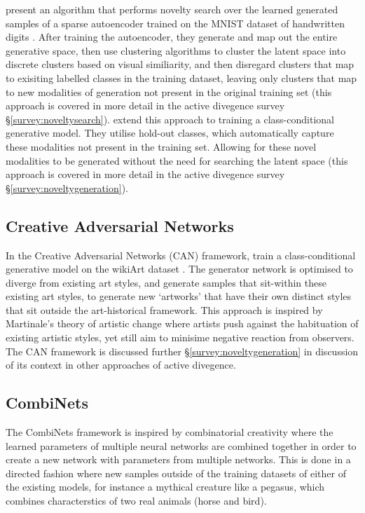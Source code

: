 \citet{kazakcci2016digits} present an algorithm that performs novelty search over the learned generated samples of a sparse autoencoder trained on the MNIST dataset of handwritten digits \citep{lecun1998gradient}.
After training the autoencoder, they generate and map out the entire generative space, then use clustering algorithms to cluster the latent space into discrete clusters based on visual similiarity, and then disregard clusters that map to exisiting labelled classes in the training dataset, leaving only clusters that map to new modalities of generation not present in the original training set (this approach is covered in more detail in the active divegence survey \S \ref{survey:noveltysearch}). 
\citep{cherti2017out} extend this approach to training a class-conditional generative model. 
They utilise hold-out classes, which automatically capture these modalities not present in the training set. 
Allowing for these novel modalities to be generated without the need for searching the latent space (this approach is covered in more detail in the active divegence survey \S \ref{survey:noveltygeneration}).   

\subsection{Creative Adversarial Networks}

In the Creative Adversarial Networks (CAN) framework, \cite{elgammal2017can} train a class-conditional generative model on the wikiArt dataset \citep{saleh2016large}. 
The generator network is optimised to diverge from existing art styles, and generate samples that sit-within these existing art styles, to generate new `artworks' that have their own distinct styles that sit outside the art-historical framework.
This approach is inspired by Martinale's theory of artistic change \citep{martindale1990clockwork} where artists push against the habituation of existing artistic styles, yet still aim to minisime negative reaction from observers. 
The CAN framework is discussed further \S \ref{survey:noveltygeneration} in discussion of its context in other approaches of active divegence. 

\subsection{CombiNets}

The CombiNets framework \citep{guzdial2018combinets} is inspired by combinatorial creativity  \citep{boden2004creative} where the learned parameters of multiple neural networks are combined together in order to create a new network with parameters from multiple networks.
This is done in a directed fashion where new samples outside of the training datasets of either of the existing models, for instance a mythical creature like a pegasus, which combines characterstics of two real animals (horse and bird).

